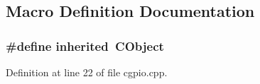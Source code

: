 \subsection{Macro Definition Documentation}
\subsubsection[{inherited}]{\setlength{\rightskip}{0pt plus 5cm}\#define inherited~C\-Object}\label{cgpio_8cpp_a3920e3b7cb0909b941b2409493acf8f1}


Definition at line 22 of file cgpio.\-cpp.

